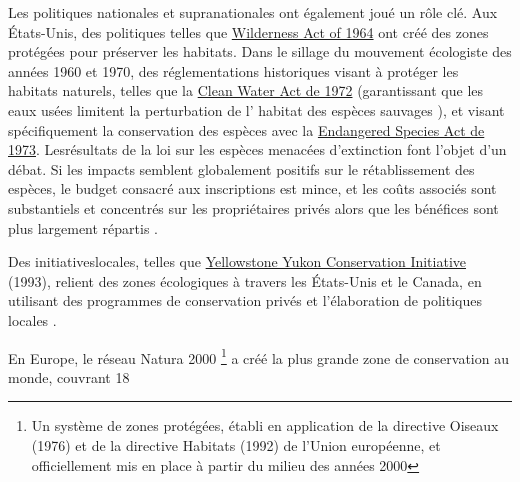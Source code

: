 \begin{displayquote}
\begin{displayquote}
\begin{displayquote}
{{Les politiques nationales et supranationales ont également joué un rôle clé.   Aux États-Unis, des politiques telles que \href{https://www.fs.usda.gov/Internet/FSE_DOCUMENTS/fseprd645666.pdf}{Wilderness Act of 1964} ont créé des zones protégées pour préserver les habitats. Dans le sillage du mouvement écologiste des années 1960 et 1970, des réglementations historiques visant à protéger les habitats naturels, telles que la \href{https://www.epa.gov/laws-regulations/summary-clean-water-act}{Clean Water Act de 1972} (garantissant que les eaux usées limitent la perturbation de l' habitat des espèces sauvages ), et visant spécifiquement la conservation des espèces avec la \href{https://www.fws.gov/sites/default/files/documents/endangered-species-act-accessible.pdf}{Endangered Species Act de 1973}. Lesrésultats de la loi sur les espèces menacées d'extinction font l'objet d'un débat. Si les impacts semblent globalement positifs sur le rétablissement des espèces, le budget consacré aux inscriptions est mince, et les coûts associés sont substantiels et concentrés sur les propriétaires privés alors que les bénéfices sont plus largement répartis \citep{brown_economics_1998, langpap_economics_2018}.

%

Des initiativeslocales, telles que \href{https://y2y.net/}{Yellowstone Yukon Conservation Initiative} (1993), relient des zones écologiques à travers les États-Unis et le Canada, en utilisant des programmes de conservation privés et l'élaboration de politiques locales . 

%

En Europe, le réseau Natura 2000 \footnote{Un système de zones protégées, établi en application de la directive Oiseaux (1976) et de la directive Habitats (1992) de l'Union européenne, et officiellement mis en place à partir du milieu des années 2000} a créé la plus grande zone de conservation au monde, couvrant 18 %



}}
\end{displayquote}
\end{displayquote}
\end{displayquote}
